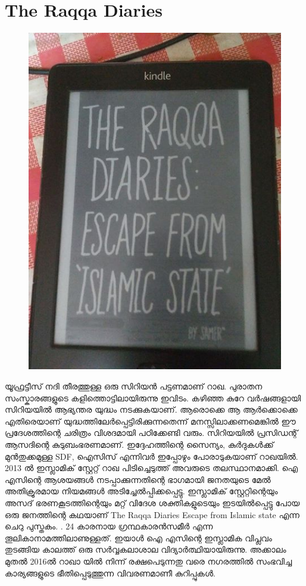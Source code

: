 \documentclass[10pt,a4paper]{report}
\begin{document}
\section{The Raqqa Diaries}
\begin{figure}[H]
  \center
\includegraphics[scale=.25]{images/raqa}
\label{raqa}
\caption{   }
\end{figure}
യൂഫ്രട്ടീസ് നദി തീരത്തുള്ള ഒരു സിറിയൻ പട്ടണമാണ് റാഖ. പുരാതന സംസ്കാരങ്ങളുടെ കളിത്തൊട്ടിലായിരുന്നു ഇവിടം. കഴിഞ്ഞ കുറേ വർഷങ്ങളായി സിറിയയിൽ ആഭ്യന്തര യുദ്ധം നടക്കുകയാണ്. ആരൊക്കെ ആ ആർക്കൊക്കെ എതിരെയാണ് യുദ്ധത്തിലേർപ്പെട്ടിരിക്കുന്നതെന്ന് മനസ്സിലാക്കണമെങ്കിൽ ഈ പ്രദേശത്തിന്റെ ചരിത്രം വിശദമായി പഠിക്കേണ്ടി വരും. സിറിയയിൽ പ്രസിഡന്റ് ആസദിന്റെ കുടുബംഭരണമാണ്. ഇദ്ദേഹത്തിന്റെ സൈന്യം, കുർദുകൾക്ക് മുൻതുക്കമുള്ള SDF, ഐസിസ് എന്നിവർ ഇപ്പോഴും പോരാടുകയാണ് റാഖയിൽ. 2013 ൽ ഇസ്ലാമിക് സ്റ്റേറ്റ് റാഖ പിടിച്ചെടുത്ത് അവരുടെ തലസ്ഥാനമാക്കി. ഐ എസിന്റെ ആശയങ്ങൾ നടപ്പാക്കുന്നതിന്റെ ഭാഗമായി ജനതയുടെ മേൽ അതിക്രൂരമായ നിയമങ്ങൾ അടിച്ചേൽപ്പിക്കപ്പെട്ടു. ഇസ്ലാമിക് സ്റ്റേറ്റിന്റെയും അസദ് ഭരണകൂടത്തിന്റെയും മറ്റ് വിദേശ ശക്തികളുടെയും ഇടയിൽപ്പെട്ടു പോയ ഒരു ജനത്തിന്റെ കഥയാണ് The Raqqa Diaries Escape from Islamic state എന്ന ചെറു പുസ്തകം. . 24 കാരനായ ഗ്രന്ഥകാരൻസമീർ എന്ന തൂലികാനാമത്തിലാണുള്ളത്. ഇയാൾ ഐ എസിന്റെ ഇസ്ലാമിക വിപ്ലവം തുടങ്ങിയ കാലത്ത് ഒരു സർവ്വകലാശാല വിദ്യാർത്ഥിയായിരുന്നു. അക്കാലം മുതൽ 2016ൽ റാഖാ യിൽ നിന്ന് രക്ഷപെടുന്നതു വരെ നഗരത്തിൽ സംഭവിച്ച കാര്യങ്ങളുടെ ഭീതിപ്പെടുത്തുന്ന വിവരണമാണീ കുറിപ്പുകൾ. 
  
\end{document}
